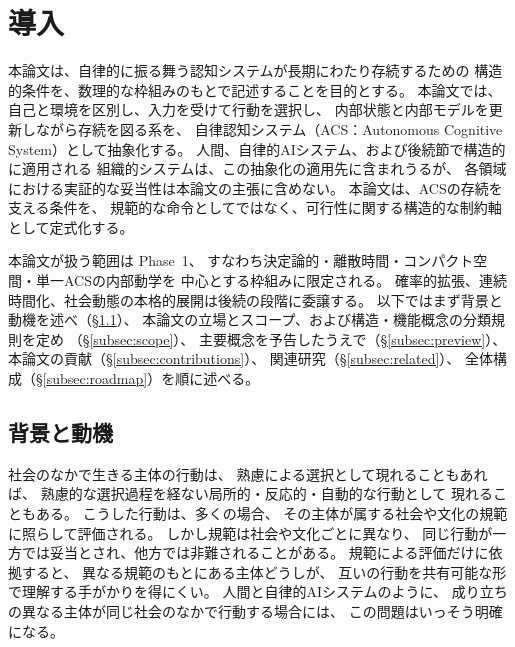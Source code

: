 \section{導入}
\label{sec:intro}

本論文は、自律的に振る舞う認知システムが長期にわたり存続するための
構造的条件を、数理的な枠組みのもとで記述することを目的とする。
本論文では、自己と環境を区別し、入力を受けて行動を選択し、
内部状態と内部モデルを更新しながら存続を図る系を、
自律認知システム（ACS：Autonomous Cognitive System）として抽象化する。
人間、自律的AIシステム、および後続節で構造的に適用される
組織的システムは、この抽象化の適用先に含まれうるが、
各領域における実証的な妥当性は本論文の主張に含めない。
本論文は、ACSの存続を支える条件を、
規範的な命令としてではなく、可行性に関する構造的な制約軸として定式化する。

本論文が扱う範囲は Phase~1、
すなわち決定論的・離散時間・コンパクト空間・単一ACSの内部動学を
中心とする枠組みに限定される。
確率的拡張、連続時間化、社会動態の本格的展開は後続の段階に委譲する。
以下ではまず背景と動機を述べ（\S\ref{subsec:background}）、
本論文の立場とスコープ、および構造・機能概念の分類規則を定め
（\S\ref{subsec:scope}）、
主要概念を予告したうえで（\S\ref{subsec:preview}）、
本論文の貢献（\S\ref{subsec:contributions}）、
関連研究（\S\ref{subsec:related}）、
全体構成（\S\ref{subsec:roadmap}）を順に述べる。

\subsection{背景と動機}
\label{subsec:background}

社会のなかで生きる主体の行動は、
熟慮による選択として現れることもあれば、
熟慮的な選択過程を経ない局所的・反応的・自動的な行動として
現れることもある。
こうした行動は、多くの場合、
その主体が属する社会や文化の規範に照らして評価される。
しかし規範は社会や文化ごとに異なり、
同じ行動が一方では妥当とされ、他方では非難されることがある。
規範による評価だけに依拠すると、
異なる規範のもとにある主体どうしが、
互いの行動を共有可能な形で理解する手がかりを得にくい。
人間と自律的AIシステムのように、
成り立ちの異なる主体が同じ社会のなかで行動する場合には、
この問題はいっそう明確になる。

